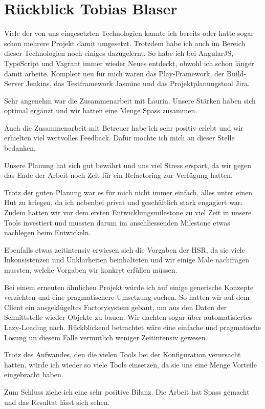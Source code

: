 	\section*{Rückblick Tobias Blaser}
		
		
		Viele der von uns eingesetzten Technologien kannte ich bereits oder hatte sogar schon mehrere Projekt damit umgesetzt.
		Trotzdem habe ich auch im Bereich dieser Technologien noch einiges dazugelernt.
		So habe ich bei AngularJS, TypeScript und Vagrant immer wieder Neues entdeckt, obwohl ich schon länger damit arbeite.
		Komplett neu für mich waren das Play-Framework, der Build-Server Jenkins, das Testframework Jasmine und das Projektplanungstool Jira.
		
		
		Sehr angenehm war die Zusammenarbeit mit Laurin. Unsere Stärken haben sich optimal ergänzt und wir hatten eine Menge Spass zusammen.
		
		Auch die Zusammenarbeit mit Betreuer habe ich sehr positiv erlebt und wir erhielten viel wertvolles Feedback.
		Dafür möchte ich mich an dieser Stelle bedanken.
		
		Unsere Planung hat sich gut bewährt und uns viel Stress erspart, da wir gegen das Ende der Arbeit noch Zeit für ein Refactoring zur Verfügung hatten.
		
		
		Trotz der guten Planung war es für mich nicht immer einfach, alles unter einen Hut zu kriegen, da ich nebenbei privat und geschäftlich stark engagiert war.
		Zudem hatten wir vor dem ersten Entwicklungsmilestone zu viel Zeit in unsere Tools investiert und mussten darum im anschliessenden Milestone etwas nachlegen beim Entwickeln.
		
		Ebenfalls etwas zeitintensiv erwiesen sich die Vorgaben der HSR, da sie viele Inkonsistenzen und Unklarheiten beinhalteten und wir einige Male nachfragen mussten, welche Vorgaben wir konkret erfüllen müssen.
		
		
		Bei einem erneuten ähnlichen Projekt würde ich auf einige generische Konzepte verzichten und eine pragmatischere Umsetzung suchen. So hatten wir auf dem Client ein ausgeklügeltes Factorysystem gebaut, um aus den Daten der Schnittstelle wieder Objekte zu bauen.
		Wir dachten sogar über automatisiertes Lazy-Loading nach. 
		Rückblickend betrachtet wäre eine einfache und pragmatische Lösung un diesem Falle vermutlich weniger Zeitintensiv gewesen.
		

		Trotz des Aufwandes, den die vielen Tools bei der Konfiguration verursacht hatten, würde ich wieder so viele Tools einsetzen, da sie uns eine Menge Vorteile eingebracht haben.
				
		
		Zum Schluss ziehe ich eine sehr positive Bilanz.
		Die Arbeit hat Spass gemacht und das Resultat lässt sich sehen.